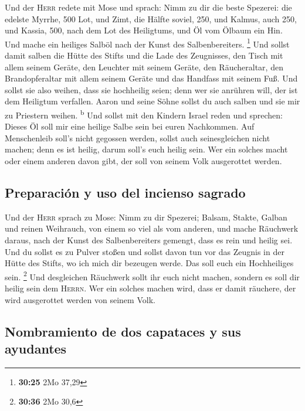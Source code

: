  Und der \textsc{Herr} redete mit Mose und sprach:
 Nimm zu dir die beste Spezerei: die edelste Myrrhe, 500
Lot, und Zimt, die Hälfte soviel, 250, und Kalmus, auch 250,
 und Kassia, 500, nach dem Lot des Heiligtums, und Öl vom
Ölbaum ein Hin.  Und mache ein heiliges Salböl nach der
Kunst des Salbenbereiters. \footnote{\textbf{30:25} 2Mo 37,29}
 Und sollst damit salben die Hütte des Stifts und die
Lade des Zeugnisses,  den Tisch mit allem seinem Geräte,
den Leuchter mit seinem Geräte, den Räucheraltar,  den
Brandopferaltar mit allem seinem Geräte und das Handfass mit seinem Fuß.
 Und sollst sie also weihen, dass sie hochheilig seien;
denn wer sie anrühren will, der ist dem Heiligtum verfallen.
 Aaron und seine Söhne sollst du auch salben und sie mir
zu Priestern weihen. \textsuperscript{b}  Und sollst mit
den Kindern Israel reden und sprechen: Dieses Öl soll mir eine heilige
Salbe sein bei euren Nachkommen.  Auf Menschenleib soll's
nicht gegossen werden, sollst auch seinesgleichen nicht machen; denn es
ist heilig, darum soll's euch heilig sein.  Wer ein
solches macht oder einem anderen davon gibt, der soll von seinem Volk
ausgerottet werden.

\hypertarget{preparaciuxf3n-y-uso-del-incienso-sagrado}{%
\subsection{Preparación y uso del incienso
sagrado}\label{preparaciuxf3n-y-uso-del-incienso-sagrado}}

 Und der \textsc{Herr} sprach zu Mose: Nimm zu dir
Spezerei; Balsam, Stakte, Galban und reinen Weihrauch, von einem so viel
als vom anderen,  und mache Räuchwerk daraus, nach der
Kunst des Salbenbereiters gemengt, dass es rein und heilig sei.
 Und du sollst es zu Pulver stoßen und sollst davon tun
vor das Zeugnis in der Hütte des Stifts, wo ich mich dir bezeugen werde.
Das soll euch ein Hochheiliges sein. \footnote{\textbf{30:36} 2Mo 30,6}
 Und desgleichen Räuchwerk sollt ihr euch nicht machen,
sondern es soll dir heilig sein dem \textsc{Herrn}.  Wer
ein solches machen wird, dass er damit räuchere, der wird ausgerottet
werden von seinem Volk.

\hypertarget{nombramiento-de-dos-capataces-y-sus-ayudantes}{%
\subsection{Nombramiento de dos capataces y sus
ayudantes}\label{nombramiento-de-dos-capataces-y-sus-ayudantes}}

